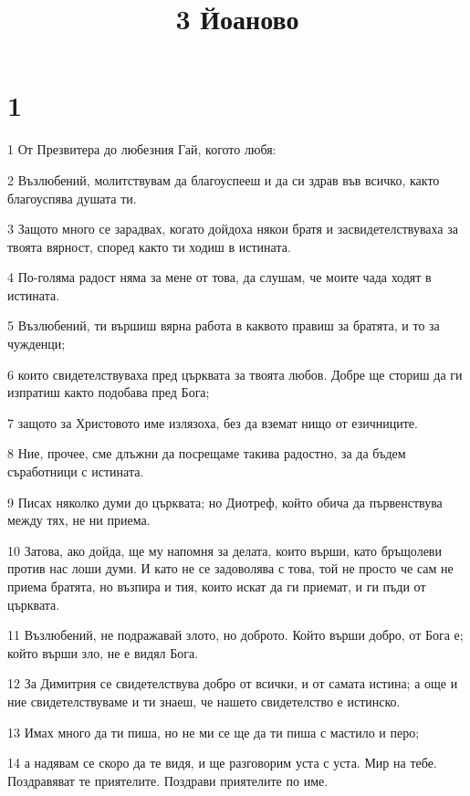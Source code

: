 

\title{3 Йоаново}


\chapter{1}

\par 1 От Презвитера до любезния Гай,  когото любя:
\par 2 Възлюбений, молитствувам да благоуспееш и да си здрав във всичко, както благоуспява душата ти.
\par 3 Защото много се зарадвах, когато дойдоха някои братя и засвидетелствуваха за твоята вярност, според както ти ходиш в истината.
\par 4 По-голяма радост няма за мене от това, да слушам, че моите чада ходят в истината.
\par 5 Възлюбений, ти вършиш вярна работа в каквото правиш за братята, и то за чужденци;
\par 6 които свидетелствуваха пред църквата за твоята любов. Добре ще сториш да ги изпратиш както подобава пред Бога;
\par 7 защото за Христовото име излязоха, без да вземат нищо от езичниците.
\par 8 Ние, прочее, сме длъжни да посрещаме такива радостно, за да бъдем съработници с истината.
\par 9 Писах няколко думи до църквата; но Диотреф, който обича да първенствува между тях, не ни приема.
\par 10 Затова, ако дойда, ще му напомня за делата, които върши, като бръщолеви против нас лоши думи. И като не се задоволява с това, той не просто че сам не приема братята, но възпира и тия, които искат да ги приемат, и ги пъди от църквата.
\par 11 Възлюбений, не подражавай злото, но доброто. Който върши добро, от Бога е; който върши зло, не е видял Бога.
\par 12 За Димитрия се свидетелствува добро от всички, и от самата истина; а още и ние свидетелствуваме и ти знаеш, че нашето свидетелство е истинско.
\par 13 Имах много да ти пиша, но не ми се ще да ти пиша с мастило и перо;
\par 14 а надявам се скоро да те видя, и ще разговорим уста с уста. Мир на тебе. Поздравяват те приятелите. Поздрави приятелите по име.


